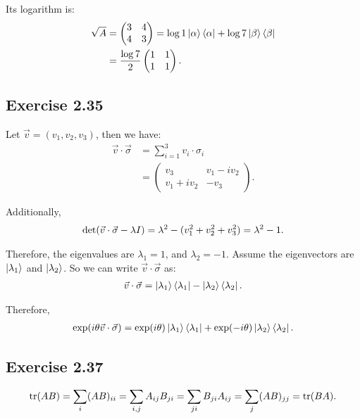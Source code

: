Its logarithm is:
\begin{align}
\sqrt A&=\begin{pmatrix}3 &4\\4 &3\end{pmatrix}=\log 1 \ket{\alpha}\bra{\alpha}+\log 7\ket{\beta}\bra{\beta}\\
&=\frac{\log 7}{2}\begin{pmatrix}1&1\\1&1\end{pmatrix}.
\end{align}

\subsection*{Exercise 2.35}

Let $\vec v = (v_1,v_2,v_3)$, then we have:
\begin{align}
\vec v\cdot \vec \sigma&=\sum_{i=1}^3 v_i\cdot\sigma_i\\
&=\begin{pmatrix} v_3 & v_1-iv_2 \\ v_1+iv_2 & -v_3\end{pmatrix}.
\end{align}

Additionally,
\begin{align}
{\rm det}(\vec v\cdot \vec \sigma-\lambda I)=\lambda^2-(v_1^2+v_2^2+v_3^2)=\lambda^2-1.
\end{align}

Therefore, the eigenvalues are $\lambda_1=1$, and $\lambda_2=-1$. Assume the eigenvectors are $\ket{\lambda_1}$ and $\ket{\lambda_2}$. So we can write $\vec v\cdot \vec \sigma$ as:
\begin{align}
\vec v\cdot \vec \sigma=\ket{\lambda_1}\bra{\lambda_1}-\ket{\lambda_2}\bra{\lambda_2}.
\end{align}

Therefore, 
\begin{align}
\exp(i\theta \vec v\cdot \vec \sigma)=\exp(i\theta)\ket{\lambda_1}\bra{\lambda_1}+\exp(-i\theta)\ket{\lambda_2}\bra{\lambda_2}.
\end{align}

\subsection*{Exercise 2.37}
\begin{align}
{\rm tr}(AB)=\sum_i(AB)_{ii}=\sum_{i,j}A_{ij}B_{ji}=\sum_{ji}B_{ji}A_{ij}=\sum_j(AB)_{jj}={\rm tr}(BA).
\end{align}

